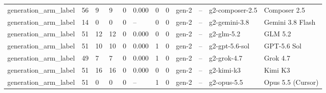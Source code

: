 \begin{tabular}{llllllllllll}
generation\_arm\_label & 56 & 9 & 9 & 0 & 0.000 & 0 & 0 & gen-2 & -- & g2-composer-2.5 & Composer 2.5 \\
generation\_arm\_label & 14 & 0 & 0 & 0 & -- & 0 & 0 & gen-2 & -- & g2-gemini-3.8 & Gemini 3.8 Flash \\
generation\_arm\_label & 51 & 12 & 12 & 0 & 0.000 & 0 & 0 & gen-2 & -- & g2-glm-5.2 & GLM 5.2 \\
generation\_arm\_label & 51 & 10 & 10 & 0 & 0.000 & 1 & 0 & gen-2 & -- & g2-gpt-5.6-sol & GPT-5.6 Sol \\
generation\_arm\_label & 49 & 7 & 7 & 0 & 0.000 & 1 & 0 & gen-2 & -- & g2-grok-4.7 & Grok 4.7 \\
generation\_arm\_label & 51 & 16 & 16 & 0 & 0.000 & 0 & 0 & gen-2 & -- & g2-kimi-k3 & Kimi K3 \\
generation\_arm\_label & 51 & 0 & 0 & 0 & -- & 1 & 0 & gen-2 & -- & g2-opus-5.5 & Opus 5.5 (Cursor) \\
\bottomrule
\end{tabular}
